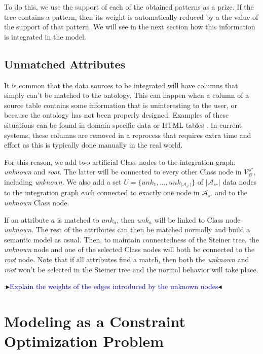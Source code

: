 \documentclass[letterpaper]{article} %
\newcommand{\authornote}[3]{
  {\fbox{\sc 
  #1}:$\blacktriangleright$\textcolor{#2}{\small{#3}}$\blacktriangleleft$}%
}
\newcommand{\ddg}[1]{\authornote{DDG}{blue}{#1}}
\begin{document}
To do this, we use the support of each of the obtained patterns as a prize. If 
the tree contains a pattern, then its weight is automatically reduced by a the 
value of the support of that pattern. We will see in the next section how this 
information is integrated in the model.

\subsection{Unmatched Attributes}
It is common that the data sources to be integrated will have columns that 
simply can't be matched to the ontology.
This can happen when a column of a source table contains some information that 
is uninteresting to the user, or because the ontology has not been properly 
designed. 
Examples of these situations can be found in domain specific data 
\cite{Pham:semantic} or HTML tables \cite{Ritze:matching}.
In current systems, these columns are removed in a reprocess that requires extra time and effort as this is typically done manually in the real world.

For this reason, we add two artificial Class nodes to the integration graph:  
\emph{unknown} and \emph{root}. 
The latter will be connected to every other Class node in 
$\mathcal{V}_\mathcal{O}^{s^\star}$, including \emph{unknown}.
We also add a set $U = \{unk_1,...,unk_{|\mathcal{A}_{s^\star}|}\}$ of 
$|\mathcal{A}_{s^\star}|$ data 
nodes to the integration graph each connected to exactly one node in 
$\mathcal{A}_{s^\star}$ and to the \emph{unknown} Class node.  

If an attribute $a$ is matched to $unk_a$, then $unk_a$ will be linked to Class 
node \emph{unknown}. The rest of the attributes can then be matched normally 
and build  a semantic model as usual. Then, to maintain connectedness of the 
Steiner tree, the \emph{unknown} node and one of the selected Class nodes will 
both be connected to the \emph{root} node. Note that if all attributes find a 
match, then both the \emph{unknown} and \emph{root} won't be selected in the 
Steiner tree and the normal behavior will take place.
\ddg{Explain the weights of the edges introduced by the unknown nodes}




\section{Modeling as a Constraint Optimization Problem \label{SEC:CP}}
\end{document}
